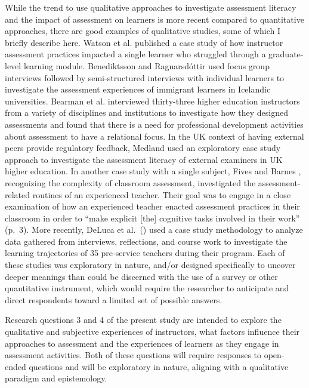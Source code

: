 \documentclass[
]{book}
\begin{document}
While the trend to use qualitative approaches to investigate assessment literacy and the impact of assessment on learners is more recent compared to quantitative approaches, there are good examples of qualitative studies, some of which I briefly describe here. Watson et al. \citeyearpar{watsonSmallDataOnline2017} published a case study of how instructor assessment practices impacted a single learner who struggled through a graduate-level learning module. Benediktsson and Ragnarsdóttir \citeyearpar{benediktssonImmigrantStudentsExperiences2020} used focus group interviews followed by semi-structured interviews with individual learners to investigate the assessment experiences of immigrant learners in Icelandic universities. Bearman et al. \citeyearpar{bearmanHowUniversityTeachers2017} interviewed thirty-three higher education instructors from a variety of disciplines and institutions to investigate how they designed assessments and found that there is a need for professional development activities about assessment to have a relational focus. In the UK context of having external peers provide regulatory feedback, Medland \citeyearpar{medlandAssessmentIlliterateShared2019} used an exploratory case study approach to investigate the assessment literacy of external examiners in UK higher education. In another case study with a single subject, Fives and Barnes \citeyearpar{fivesNavigatingComplexCognitive2020}, recognizing the complexity of classroom assessment, investigated the assessment-related routines of an experienced teacher. Their goal was to engage in a close examination of how an experienced teacher enacted assessment practices in their classroom in order to ``make explicit {[}the{]} cognitive tasks involved in their work'' (p.~3). More recently, DeLuca et al.~(\citeyearpar{delucaPedagogySlowSignificant2021}) used a case study methodology to analyze data gathered from interviews, reflections, and course work to investigate the learning trajectories of 35 pre-service teachers during their program. Each of these studies was exploratory in nature, and/or designed specifically to uncover deeper meanings than could be discerned with the use of a survey or other quantitative instrument, which would require the researcher to anticipate and direct respondents toward a limited set of possible answers.

Research questions 3 and 4 of the present study are intended to explore the qualitative and subjective experiences of instructors, what factors influence their approaches to assessment and the experiences of learners as they engage in assessment activities. Both of these questions will require responses to open-ended questions and will be exploratory in nature, aligning with a qualitative paradigm and epistemology.
\end{document}
